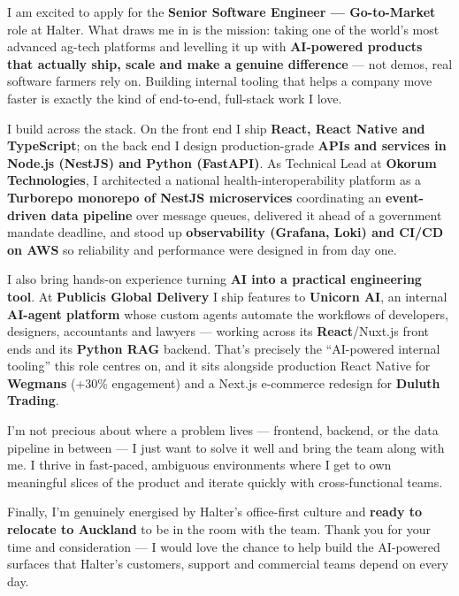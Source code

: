 \documentclass[11pt,a4paper]{awesome-cv}
\begin{document}
\makecvheader[R]
\makelettertitle

\begin{cvletter}

I am excited to apply for the \textbf{Senior Software Engineer — Go-to-Market} role at Halter. What draws me in is the mission: taking one of the world's most advanced ag-tech platforms and levelling it up with \textbf{AI-powered products that actually ship, scale and make a genuine difference} — not demos, real software farmers rely on. Building internal tooling that helps a company move faster is exactly the kind of end-to-end, full-stack work I love.

I build across the stack. On the front end I ship \textbf{React, React Native and TypeScript}; on the back end I design production-grade \textbf{APIs and services in Node.js (NestJS) and Python (FastAPI)}. As Technical Lead at \textbf{Okorum Technologies}, I architected a national health-interoperability platform as a \textbf{Turborepo monorepo of NestJS microservices} coordinating an \textbf{event-driven data pipeline} over message queues, delivered it ahead of a government mandate deadline, and stood up \textbf{observability (Grafana, Loki) and CI/CD on AWS} so reliability and performance were designed in from day one.

I also bring hands-on experience turning \textbf{AI into a practical engineering tool}. At \textbf{Publicis Global Delivery} I ship features to \textbf{Unicorn AI}, an internal \textbf{AI-agent platform} whose custom agents automate the workflows of developers, designers, accountants and lawyers — working across its \textbf{React}/Nuxt.js front ends and its \textbf{Python RAG} backend. That's precisely the ``AI-powered internal tooling'' this role centres on, and it sits alongside production React Native for \textbf{Wegmans} (+30\% engagement) and a Next.js e-commerce redesign for \textbf{Duluth Trading}.

I'm not precious about where a problem lives — frontend, backend, or the data pipeline in between — I just want to solve it well and bring the team along with me. I thrive in fast-paced, ambiguous environments where I get to own meaningful slices of the product and iterate quickly with cross-functional teams.

Finally, I'm genuinely energised by Halter's office-first culture and \textbf{ready to relocate to Auckland} to be in the room with the team. Thank you for your time and consideration — I would love the chance to help build the AI-powered surfaces that Halter's customers, support and commercial teams depend on every day.

\end{cvletter}

\makeletterclosing
\end{document}
